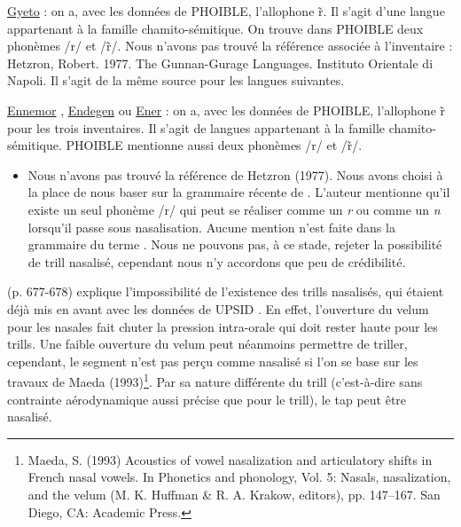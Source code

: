\begin{exe}
\begin{xlist}
	\ex \href{https://phoible.org/inventories/view/1464}{Gyeto}  : on a, avec les données de PHOIBLE, l'allophone r̃. Il s'agit d'une langue appartenant à la famille chamito-sémitique. On trouve dans PHOIBLE deux phonèmes /r/ et /r̃/. Nous n'avons pas trouvé la référence associée à l'inventaire : Hetzron, Robert. 1977. The Gunnan-Gurage Languages. Instituto Orientale di Napoli. Il s'agit de la même source pour les langues suivantes.

	\ex \href{https://phoible.org/inventories/view/1465}{Ennemor} , \href{https://phoible.org/inventories/view/1466}{Endegen} ou \href{https://phoible.org/inventories/view/1467}{Ener} : on a, avec les données de PHOIBLE, l'allophone r̃ pour les trois inventaires. Il s'agit de langues appartenant à la famille chamito-sémitique. PHOIBLE mentionne aussi deux phonèmes /r/ et /r̃/.
	\begin{itemize}
		\item Nous n'avons pas trouvé la référence de Hetzron (1977). Nous avons choisi à la place de nous baser sur la grammaire récente de \textcite{vollminGrammarGumerPhonologyMorphology2017}. L'auteur mentionne qu'il existe un seul phonème /r/ qui peut se réaliser comme un \textit{r} ou comme un \textit{n} lorsqu'il passe sous nasalisation. Aucune mention n'est faite dans la grammaire du terme . Nous ne pouvons pas, à ce stade, rejeter la possibilité de trill nasalisé, cependant nous n'y accordons que peu de crédibilité.
	\end{itemize}
	\end{xlist}		
\end{exe}


\textcite{soleAerodynamicCharacteristicsTrills2002} (p. 677-678) explique l'impossibilité de l'existence des trills nasalisés, qui étaient déjà mis en avant avec les données de UPSID \parencite{maddiesonPatternsSounds1984}. En effet, l'ouverture du velum pour les nasales fait chuter la pression intra-orale qui doit rester haute pour les trills. Une faible ouverture du velum peut néanmoins permettre de triller, cependant, le segment n'est pas perçu comme nasalisé si l'on se base sur les travaux de Maeda (1993)\footnote{Maeda, S. (1993) Acoustics of vowel nasalization and articulatory shifts in French nasal vowels. In Phonetics and phonology, Vol. 5: Nasals, nasalization, and the velum (M. K. Huffman \& R. A. Krakow, editors), pp. 147–167. San Diego, CA: Academic Press.}. Par sa nature différente du trill (c'est-à-dire sans contrainte aérodynamique aussi précise que pour le trill), le tap peut être nasalisé.\\

